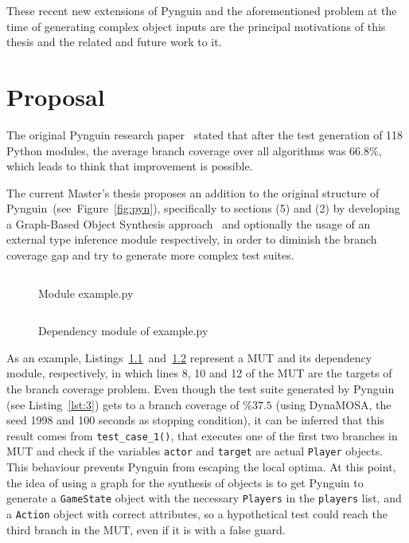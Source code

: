 \documentclass[%
  chapterprefix=false,%
  open=right,%
  twoside=true,%
  paper=a4,%
  logofile={Figures/logo.png},%
  thesistype=master,%
  UKenglish,%
]{se2thesis}
\begin{document}
These recent new extensions of Pynguin and the aforementioned problem at the time of generating complex object inputs are the principal motivations of this thesis and the related and future work to it.

\chapter{Proposal}

The original Pynguin research paper~\cite{DBLP:conf/icse/LukasczykF22} stated that after the test generation of 118 Python modules, the average branch coverage over all algorithms was $66.8\%$, which leads to think that improvement is possible.

The current Master's thesis proposes an addition to the original structure of Pynguin~(see~Figure~\ref{fig:pyn}), specifically to sections (5) and (2) by developing
a Graph-Based Object Synthesis approach~\cite{DBLP:conf/sigsoft/0001O00D21} and optionally the usage of an external type inference module respectively, in order to diminish the branch coverage gap and try to generate more complex test suites.

\begin{figure}
    \inputminted[linenos]{python}{Figures/example.py}
    \caption{Module example.py\label{lst:1}}
\end{figure}

\begin{figure}
  \inputminted[linenos]{python}{Figures/dependencies.py}
  \caption{Dependency module of example.py\label{lst:2}}
\end{figure}

As an example, Listings~\ref{lst:1}~and~\ref{lst:2} represent a MUT and its dependency module, respectively, in which lines 8, 10 and 12 of the MUT are the targets of the branch coverage problem.
Even though the test suite generated by Pynguin (see Listing~\ref{lst:3}) gets to a branch coverage of \(\%37.5\) (using DynaMOSA, the seed 1998 and 100 seconds as stopping condition), it can be inferred that this result comes from \verb|test_case_1()|, that executes one of the first two branches in MUT and check if the variables \verb|actor| and \verb|target| are actual \verb|Player| objects.
This behaviour prevents Pynguin from escaping the local optima.
At this point, the idea of using a graph for the synthesis of objects is to get Pynguin to generate a \verb|GameState| object with the necessary \verb|Players| in the \verb|players| list, and a \verb|Action| object with correct attributes, so a hypothetical test could reach the third branch in the MUT, even if it is with a false guard.
  
\end{document}
